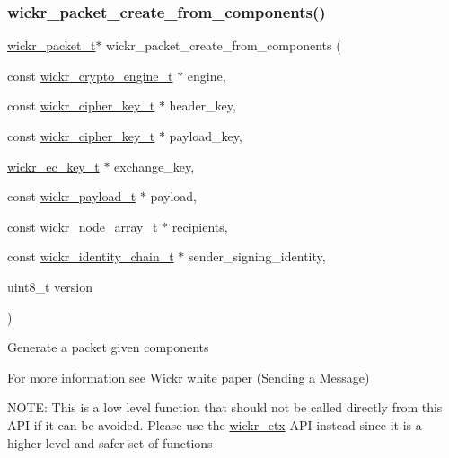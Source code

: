 \subsubsection{\texorpdfstring{wickr\+\_\+packet\+\_\+create\+\_\+from\+\_\+components()}{wickr\_packet\_create\_from\_components()}}
{\footnotesize\ttfamily \mbox{\hyperlink{structwickr__packet}{wickr\+\_\+packet\+\_\+t}}$\ast$ wickr\+\_\+packet\+\_\+create\+\_\+from\+\_\+components (\begin{DoxyParamCaption}\item[{const \mbox{\hyperlink{structwickr__crypto__engine}{wickr\+\_\+crypto\+\_\+engine\+\_\+t}} $\ast$}]{engine,  }\item[{const \mbox{\hyperlink{structwickr__cipher__key}{wickr\+\_\+cipher\+\_\+key\+\_\+t}} $\ast$}]{header\+\_\+key,  }\item[{const \mbox{\hyperlink{structwickr__cipher__key}{wickr\+\_\+cipher\+\_\+key\+\_\+t}} $\ast$}]{payload\+\_\+key,  }\item[{\mbox{\hyperlink{structwickr__ec__key}{wickr\+\_\+ec\+\_\+key\+\_\+t}} $\ast$}]{exchange\+\_\+key,  }\item[{const \mbox{\hyperlink{structwickr__payload}{wickr\+\_\+payload\+\_\+t}} $\ast$}]{payload,  }\item[{const wickr\+\_\+node\+\_\+array\+\_\+t $\ast$}]{recipients,  }\item[{const \mbox{\hyperlink{structwickr__identity__chain}{wickr\+\_\+identity\+\_\+chain\+\_\+t}} $\ast$}]{sender\+\_\+signing\+\_\+identity,  }\item[{uint8\+\_\+t}]{version }\end{DoxyParamCaption})}

Generate a packet given components

For more information see Wickr white paper (Sending a Message)

N\+O\+TE\+: This is a low level function that should not be called directly from this A\+PI if it can be avoided. Please use the \textquotesingle{}\mbox{\hyperlink{structwickr__ctx}{wickr\+\_\+ctx}}\textquotesingle{} A\+PI instead since it is a higher level and safer set of functions


